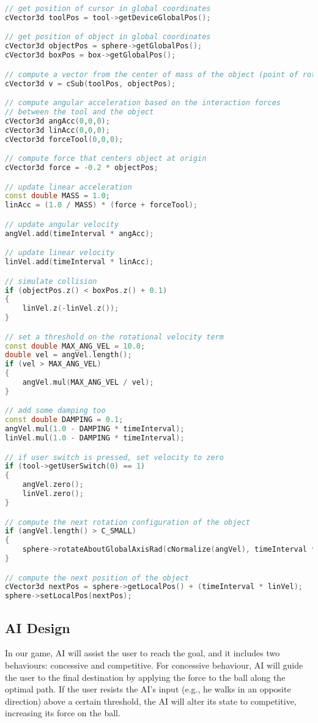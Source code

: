 \documentclass[a4paper]{article}
\begin{document}
\begin{lstlisting}[language=C++, caption=Graphic Simulation]
// get position of cursor in global coordinates
cVector3d toolPos = tool->getDeviceGlobalPos();

// get position of object in global coordinates
cVector3d objectPos = sphere->getGlobalPos();
cVector3d boxPos = box->getGlobalPos();

// compute a vector from the center of mass of the object (point of rotation) to the tool
cVector3d v = cSub(toolPos, objectPos);

// compute angular acceleration based on the interaction forces
// between the tool and the object
cVector3d angAcc(0,0,0);
cVector3d linAcc(0,0,0);
cVector3d forceTool(0,0,0);

// compute force that centers object at origin
cVector3d force = -0.2 * objectPos;

// update linear acceleration
const double MASS = 1.0;
linAcc = (1.0 / MASS) * (force + forceTool);

// update angular velocity
angVel.add(timeInterval * angAcc);

// update linear velocity
linVel.add(timeInterval * linAcc);

// simulate collision
if (objectPos.z() < boxPos.z() + 0.1)
{
    linVel.z(-linVel.z());
}

// set a threshold on the rotational velocity term
const double MAX_ANG_VEL = 10.0;
double vel = angVel.length();
if (vel > MAX_ANG_VEL)
{
    angVel.mul(MAX_ANG_VEL / vel);
}

// add some damping too
const double DAMPING = 0.1;
angVel.mul(1.0 - DAMPING * timeInterval);
linVel.mul(1.0 - DAMPING * timeInterval);

// if user switch is pressed, set velocity to zero
if (tool->getUserSwitch(0) == 1)
{
    angVel.zero();
    linVel.zero();
}

// compute the next rotation configuration of the object
if (angVel.length() > C_SMALL)
{
    sphere->rotateAboutGlobalAxisRad(cNormalize(angVel), timeInterval * angVel.length());
}

// compute the next position of the object
cVector3d nextPos = sphere->getLocalPos() + (timeInterval * linVel);
sphere->setLocalPos(nextPos);
\end{lstlisting}


\subsection{AI Design}
In our game, AI will assist the user to reach the goal, and it includes two behaviours: concessive and competitive. For concessive behaviour, AI will guide the user to the final destination by applying the force to the ball along the optimal path. If the user resists the AI’s input (e.g., he walks in an opposite direction) above a certain threshold, the AI will alter its state to competitive, increasing its force on the ball. 
\end{document}
